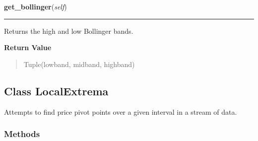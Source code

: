 \hspace{.8\funcindent}\begin{boxedminipage}{\funcwidth}

    \raggedright \textbf{get\_bollinger}(\textit{self})

    \vspace{-1.5ex}

    \rule{\textwidth}{0.5\fboxrule}
\setlength{\parskip}{2ex}
    Returns the high and low Bollinger bands.

\setlength{\parskip}{1ex}
      \textbf{Return Value}
    \vspace{-1ex}

      \begin{quote}
      Tuple(lowband, midband, highband)

      \end{quote}

    \end{boxedminipage}



\subsection{Class LocalExtrema}

    \label{nukaquant:LocalExtrema}
Attempts to find price pivot points over a given interval in a stream of 
data.



  \subsubsection{Methods}

    \label{nukaquant:LocalExtrema:__init__}

    \vspace{0.5ex}

